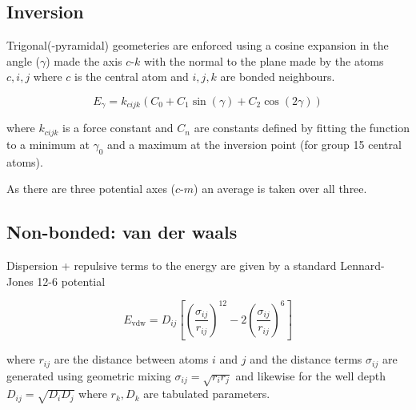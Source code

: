 \documentclass[10pt]{article}
\begin{document}
\subsection{Inversion}

Trigonal(-pyramidal) geometeries are enforced using a cosine expansion in the
angle ($\gamma$) made the axis $c\text{-}k$ with the normal to the plane made by the
atoms $c, i, j$ where $c$ is the central atom and $i,j,k$ are bonded neighbours.

\begin{equation}
    E_\gamma = k_{cijk} (C_0 + C_1 \sin(\gamma) + C_2 \cos(2\gamma))
\end{equation}

where $k_{cijk}$ is a force constant and $C_n$ are constants defined by fitting
the function to a minimum at $\gamma_0$ and a maximum at the inversion point (for
group 15 central atoms).

As there are three potential axes ($c\text{-}m$) an average is taken over all three.

    
\subsection{Non-bonded: van der waals}

Dispersion + repulsive terms to the energy are given by a standard Lennard-Jones
12-6 potential

\begin{equation}
    E_\text{vdw} = D_{ij} \left[\left( \frac{\sigma_{ij}}{r_{ij}} \right)^{12}
                                -2 \left( \frac{\sigma_{ij}}{r_{ij}} \right)^6
                            \right]
\end{equation}

where $r_{ij}$ are the distance between atoms $i$ and $j$ and the distance
terms $\sigma_{ij}$ are generated using geometric mixing
$\sigma_{ij} = \sqrt{r_i r_j}$ and likewise for the well depth
$D_{ij} = \sqrt{D_i D_j}$ where $r_k, D_k$ are tabulated parameters.
\end{document}
